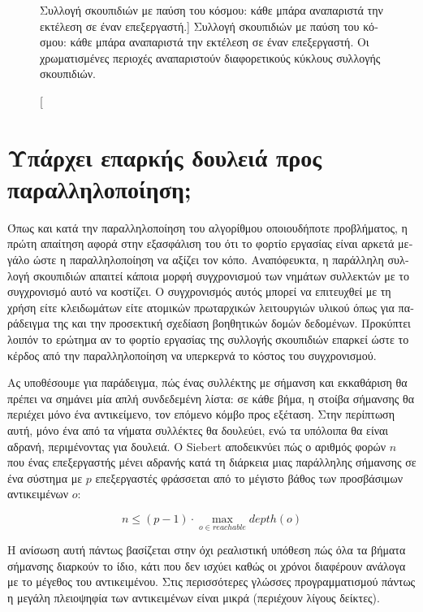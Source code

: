 \begin{greek}
\begin{figure}[H]
  \caption
    [Συλλογή σκουπιδιών με παύση του κόσμου: κάθε μπάρα αναπαριστά
     την εκτέλεση σε έναν επεξεργαστή.]
    {Συλλογή σκουπιδιών με παύση του κόσμου: κάθε μπάρα αναπαριστά
     την εκτέλεση σε έναν επεξεργαστή. Οι χρωματισμένες περιοχές
     αναπαριστούν διαφορετικούς κύκλους συλλογής σκουπιδιών.}
  \label{fig:par_1}
\end{figure}

\section{Υπάρχει επαρκής δουλειά προς παραλληλοποίηση;}
Όπως και κατά την παραλληλοποίηση του αλγορίθμου οποιουδήποτε
προβλήματος, η πρώτη απαίτηση αφορά στην εξασφάλιση του ότι
το φορτίο εργασίας είναι αρκετά μεγάλο ώστε η παραλληλοποίηση
να αξίζει τον κόπο. Αναπόφευκτα, η παράλληλη συλλογή σκουπιδιών
απαιτεί κάποια μορφή συγχρονισμού των νημάτων συλλεκτών με το
συγχρονισμό αυτό να κοστίζει. Ο συγχρονισμός αυτός μπορεί να
επιτευχθεί με τη χρήση είτε κλειδωμάτων είτε ατομικών πρωταρχικών
λειτουργιών υλικού όπως για παράδειγμα της 
και την προσεκτική σχεδίαση βοηθητικών δομών δεδομένων. Προκύπτει
λοιπόν το ερώτημα αν το φορτίο εργασίας της συλλογής σκουπιδιών
επαρκεί ώστε το κέρδος από την παραλληλοποίηση να υπερκερνά το
κόστος του συγχρονισμού.

Aς υποθέσουμε για παράδειγμα, πώς ένας συλλέκτης με σήμανση
και εκκαθάριση θα πρέπει να σημάνει μία απλή συνδεδεμένη λίστα:
σε κάθε βήμα, η στοίβα σήμανσης θα περιέχει μόνο ένα αντικείμενο,
τον επόμενο κόμβο προς εξέταση. Στην περίπτωση αυτή, μόνο ένα από
τα νήματα συλλέκτες θα δουλεύει, ενώ τα υπόλοιπα θα είναι αδρανή,
περιμένοντας για δουλειά. Ο Siebert \cite{DBLP:conf/iwmm/Siebert08}
αποδεικνύει πώς ο αριθμός φορών $n$ που ένας επεξεργαστής μένει
αδρανής κατά τη διάρκεια μιας παράλληλης σήμανσης σε ένα σύστημα
με $p$ επεξεργαστές φράσσεται από το μέγιστο βάθος των προσβάσιμων
αντικειμένων $o$:

\begin{equation}
  n \leq (p-1) \cdot \max_{o \in reachable}{depth(o)}
  \label{eq:par_1}
\end{equation}

Η ανίσωση αυτή πάντως βασίζεται στην όχι ρεαλιστική υπόθεση
πώς όλα τα βήματα σήμανσης διαρκούν το ίδιο, κάτι που δεν ισχύει
καθώς οι χρόνοι διαφέρουν ανάλογα με το μέγεθος του αντικειμένου.
Στις περισσότερες γλώσσες προγραμματισμού πάντως η μεγάλη πλειοψηφία
των αντικειμένων είναι μικρά (περιέχουν λίγους δείκτες).


\end{greek}
